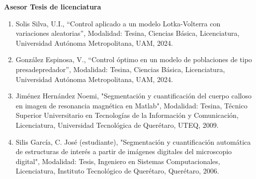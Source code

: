 \textbf{Asesor Tesis de licenciatura}

\hfill

\begin{enumerate}

\item Solis Silva, U.I., “Control aplicado a un modelo Lotka-Volterra con variaciones aleatorias”, Modalidad:
Tesina, Ciencias Básica, Licenciatura, Universidad Autónoma Metropolitana, UAM, 2024.

\item González Espinosa, V., “Control óptimo en un modelo de poblaciones de tipo presadepredador”, Modalidad:
Tesina, Ciencias Básica, Licenciatura, Universidad Autónoma Metropolitana, UAM, 2024.

\item Jiménez Hernández Noemi, "Segmentación y cuantificación del cuerpo calloso en imagen de resonancia
magnética en Matlab", Modalidad: Tesina, Técnico Superior Universitario en Tecnologías de la Información y Comunicación,
Licenciatura, Universidad Tecnológica de Querétaro, UTEQ, 2009.

\item Silis García, C. José (estudiante), "Segmentación y cuantificación automática de estructuras de interés a partir de
imágenes digitales del microscopio digital", Modalidad: Tesis, Ingeniero en Sistemas Computacionales, Licenciatura,
Instituto Tecnológico de Querétaro, Querétaro, 2006.
\end{enumerate}
